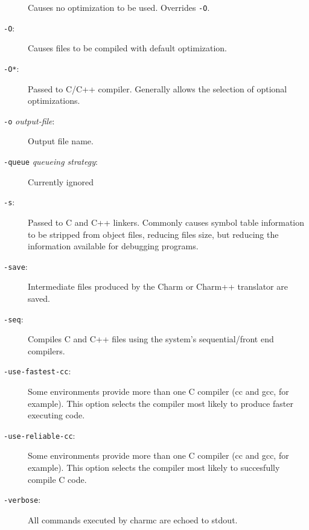 \begin{description}
Causes no optimization to be used.  Overrides {\tt -O}.

\item[{\tt -O}:]

Causes files to be compiled with default optimization.

\item[{\tt -O*}:]

Passed to C/C++ compiler.  Generally allows the selection of optional
optimizations.

\item[{\tt -o} {\em output-file}:]

Output file name.

\item[{\tt -queue} {\em queueing strategy}:]

Currently ignored

\item[{\tt -s}:]

Passed to C and C++ linkers.  Commonly causes symbol table information
to be stripped from object files, reducing files size, but reducing
the information available for debugging programs.

\item[{\tt -save}:]

Intermediate files produced by the Charm or Charm++ translator are saved.

\item[{\tt -seq}:]

Compiles C and C++ files using the system's sequential/front end
compilers.

\item[{\tt -use-fastest-cc}:]

Some environments provide more than one C compiler (cc and gcc, for
example).  This option selects the compiler most likely to produce
faster executing code.

\item[{\tt -use-reliable-cc}:]

Some environments provide more than one C compiler (cc and gcc, for
example).  This option selects the compiler most likely to succesfully
compile C code.

\item[{\tt -verbose}:]

All commands executed by charmc are echoed to stdout.

\end{description}



